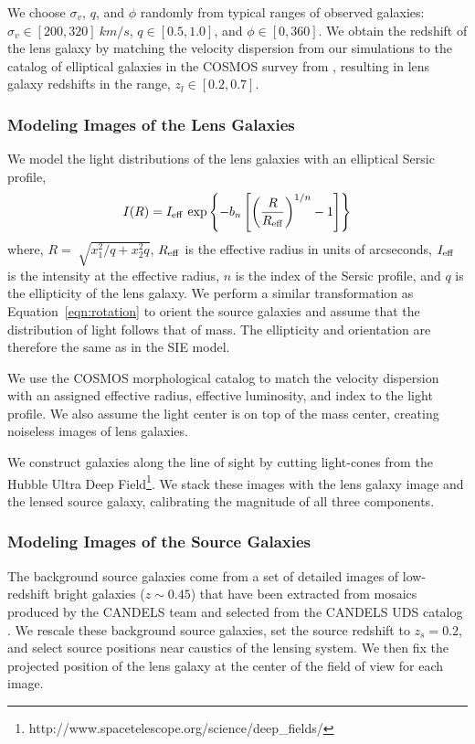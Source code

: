 \documentclass{emulateapj}
\begin{document}
We choose $\sigma_v$, $q$, and $\phi$ randomly from typical ranges of
observed galaxies: $\sigma_v \in [200, 320]~km/s$, $q \in [0.5, 1.0]$,
and $\phi \in [0, 360]$.  We obtain the redshift of the lens galaxy by
matching the velocity dispersion from our simulations to the catalog
of elliptical galaxies in the COSMOS survey from \citet{zahid_etal15},
resulting in lens galaxy redshifts in the range, $z_l \in [0.2,0.7]$.

\subsubsection{Modeling Images of the Lens Galaxies}
We model the light distributions of the lens galaxies with an
elliptical Sersic profile,
\begin{equation}\label{eqn:sersic} 
I(R) = I_{\rm eff}~{\rm exp} \left\lbrace -b_{n} \left[ \left(
  \frac{R}{R_{\rm eff}}\right)^{1/n} - 1 \right ]
\right\rbrace 
\end{equation}
where, $R = \sqrt[]{x_1^2 /q+x_2^2 q }$, $R_{\rm eff}$ is the
effective radius in units of arcseconds, $I_{\rm eff}$ is the
intensity at the effective radius, $n$ is the index of the Sersic
profile, and $q$ is the ellipticity of the lens galaxy.  We perform a
similar transformation as Equation~\ref{eqn:rotation} to orient the
source galaxies and assume that the distribution of light follows that
of mass.  The ellipticity and orientation are therefore the same as in
the SIE model.

We use the COSMOS morphological catalog \citep{zahid_etal15} to match
the velocity dispersion with an assigned effective radius, effective
luminosity, and index to the light profile.  We also assume the light
center is on top of the mass center, creating noiseless images of lens
galaxies.

We construct galaxies along the line of sight by cutting light-cones
from the Hubble Ultra Deep
Field\footnote{http://www.spacetelescope.org/science/deep\_fields/}.
We stack these images with the lens galaxy image and the lensed source
galaxy, calibrating the magnitude of all three components.

\subsubsection{Modeling Images of the Source Galaxies}
The background source galaxies come from a set of detailed images of
low-redshift bright galaxies ($z\sim0.45$) that have been extracted
from mosaics produced by the CANDELS team
\citep{grogin_etal11,koekemoer_etal11} and selected from the CANDELS
UDS catalog \citep{galametz_etal13}.  We rescale these background
source galaxies, set the source redshift to $z_s=0.2$, and select
source positions near caustics of the lensing system.  We then fix the
projected position of the lens galaxy at the center of the field of
view for each image.
\end{document}
